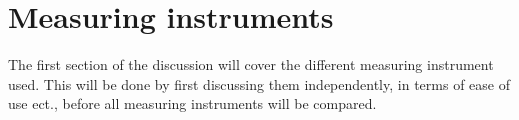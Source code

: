 \section{Measuring instruments}

The first section of the discussion will cover the different measuring instrument used. This will be done by first discussing them independently, in terms of ease of use ect., before all measuring instruments will be compared.




